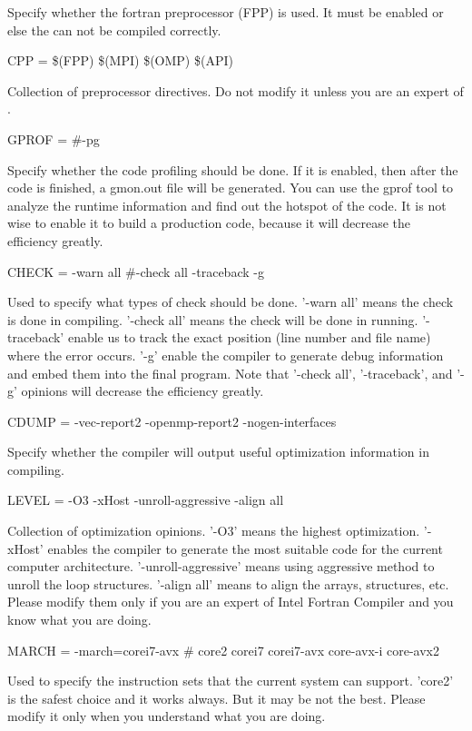 Specify whether the fortran preprocessor (FPP) is used. It must be enabled or else the {\iqist} can not be compiled correctly.

{\color{red}CPP    = \$(FPP) \$(MPI) \$(OMP) \$(API)}

Collection of preprocessor directives. Do not modify it unless you are an expert of {\iqist}.

{\color{red}GPROF  = \#-pg}

Specify whether the code profiling should be done. If it is enabled, then after the code is finished, a gmon.out file will be generated. You can use the gprof tool to analyze the runtime information and find out the hotspot of the code. It is not wise to enable it to build a production code, because it will decrease the efficiency greatly.

{\color{red}CHECK  = -warn all \#-check all -traceback -g}

Used to specify what types of check should be done. '-warn all' means the check is done in compiling. '-check all' means the check will be done in running. '-traceback' enable us to track the exact position (line number and file name) where the error occurs. '-g' enable the compiler to generate debug information and embed them into the final program. Note that '-check all', '-traceback', and '-g' opinions will decrease the efficiency greatly.

{\color{red}CDUMP  = -vec-report2 -openmp-report2 -nogen-interfaces}

Specify whether the compiler will output useful optimization information in compiling.

{\color{red}LEVEL  = -O3 -xHost -unroll-aggressive -align all}

Collection of optimization opinions. '-O3' means the highest optimization. '-xHost' enables the compiler to generate the most suitable code for the current computer architecture. '-unroll-aggressive' means using aggressive method to unroll the loop structures. '-align all' means to align the arrays, structures, etc. Please modify them only if you are an expert of Intel Fortran Compiler and you know what you are doing.

{\color{red}MARCH  = -march=corei7-avx \# core2 corei7 corei7-avx core-avx-i core-avx2}

Used to specify the instruction sets that the current system can support. 'core2' is the safest choice and it works always. But it may be not the best. Please modify it only when you understand what you are doing.

